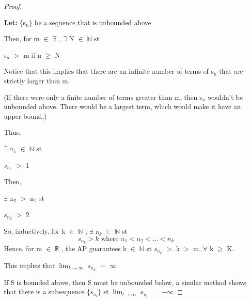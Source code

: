 \documentclass{article}
\newcommand{\mt}[1]{\ensuremath{#1}}
\newcommand{\bgpf}{\begin{proof} $ $\newline}
\newcommand{\lt}[1]{\textbf{Let: } #1}
\newcommand{\epf}{\end{proof}}
\newcommand{\dbs}[3]{\mt{#1_{#2_#3}}}
\newcommand{\br}{\mt{\mathbb{R}} }       %
\newcommand{\bn}{\mt{\mathbb{N}} }       %
\newcommand{\fa}{\mt{\forall} }          %
\newcommand{\mem}{\mt{\in} }
\newcommand{\exs}{\mt{\exists} }
\newcommand{\bk}[1]{\{#1\}}
\newcommand{\gr}{\mt{>} }
\newcommand{\gre}{\mt{\geq} }
\newcommand{\eql}{\mt{=} }
\newcommand{\uw}[2]{#1\mt{_{#2}}}
\newcommand{\lmti}[1]{\mt{\displaystyle{\lim_{#1 \to \infty}}}}
\newcommand{\eqn}[1]{\[#1\]}
\newcommand{\infy}{\mt{\infty} }
\begin{document}
{{\bgpf

\lt{\bk{\uw{s}{n}} be a sequence that is unbounded above}

Then, for m \mem \br, \exs N \mem \bn st

\uw{s}{n} \gr m if n \gre N

Notice that this implies that there are an infinite number of terms of \uw{s}{n} that are strictly larger than m.

(If there were only a finite number of terms greater than m, then \uw{s}{n} wouldn't be unbounded above. There would be a largest term, which would make it have an upper bound.)

Thus,

\exs \uw{n}{1} \mem \bn st

\dbs{s}{n}{1} \gr 1

Then,

\exs \uw{n}{2} \gr \uw{n}{1} st

\dbs{s}{n}{2} \gr 2

So, inductively, for k \mem \bn, \exs \uw{n}{k} \mem \bn st
\eqn{\dbs{s}{n}{k} \gr k \textrm{ where } n_1 < n_2 < ... < n_k}
Hence, for m \mem \br, the AP guarantees k \mem \bn st \dbs{s}{n}{k} \gr k \gr m, \fa k \gre K.

This implies that \lmti{k} \dbs{s}{n}{k} \eql \infy

If S is bounded above, then S must be unbounded below, a similar method shows that there is a subsequence \bk{\dbs{s}{n}{l}} st \lmti{l} \dbs{s}{n}{l} \eql $-\infty$

\epf
}
}
\end{document}

